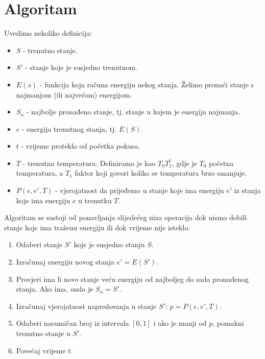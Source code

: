 \documentclass[times, utf8, zavrsni]{fer}
\begin{document}
\section{Algoritam}
Uvedimo nekoliko definicija:
\begin{itemize}
\item $S$ - trenutno stanje.

\item $S'$ - stanje koje je susjedno trenutnom.

\item $E(s)$ - funkcija koja računa energiju nekog stanja. Želimo pronaći
stanje s najmanjom (ili najvećom) energijom. 

\item $S_{n}$ - najbolje pronađeno stanje, tj. stanje u kojem je 
energija najmanja.

\item $e$ - energija trenutnog stanja, tj. $E(S)$.

\item $t$ - vrijeme proteklo od početka pokusa. 

\item $T$ - trenutna temperatura. Definiramo je kao $T_0 T_1^{t}$, gdje je
$T_0$ početna temperatura, a $T_1$ faktor koji govori koliko se temperatura
brzo smanjuje. 

\item $P(e, e', T)$ - vjerojatnost da prijeđemo u stanje koje ima energiju
$e'$ iz stanja koje ima energiju $e$ u trenutku $T$. 
\end{itemize}

Algoritam se sastoji od ponavljanja slijedećeg niza operacija
dok nismo dobili stanje koje ima traženu energiju ili dok vrijeme nije isteklo.

\begin{enumerate}
\item
Odaberi stanje $S'$ koje je susjedno stanju $S$. 

\item
Izračunaj energiju novog stanja $e' = E(S')$. 

\item 
Provjeri ima li novo stanje veću energiju od najboljeg do sada pronađenog stanja.
Ako ima, onda je $S_n = S'$.

\item
Izračunaj vjerojatnost napredovanja u stanje $S'$: $p = P(e, e', T)$. 

\item
Odaberi nasumičan broj iz intervala $[0, 1]$ i ako je manji od $p$, 
pomakni trenutno stanje u $S'$. 

\item 
Povećaj vrijeme $t$. 

\end{enumerate}
\end{document}
